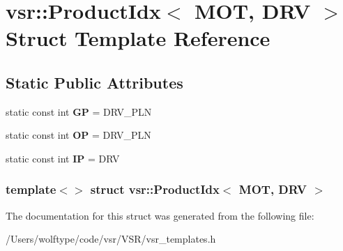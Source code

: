 \hypertarget{structvsr_1_1_product_idx_3_01_m_o_t_00_01_d_r_v_01_4}{\section{vsr\-:\-:Product\-Idx$<$ M\-O\-T, D\-R\-V $>$ Struct Template Reference}
\label{structvsr_1_1_product_idx_3_01_m_o_t_00_01_d_r_v_01_4}
}
\subsection*{Static Public Attributes}
\begin{DoxyCompactItemize}
\item 
\hypertarget{structvsr_1_1_product_idx_3_01_m_o_t_00_01_d_r_v_01_4_a4b8488441d350b8561800867d2665a39}{static const int {\bfseries G\-P} = D\-R\-V\-\_\-\-P\-L\-N}\label{structvsr_1_1_product_idx_3_01_m_o_t_00_01_d_r_v_01_4_a4b8488441d350b8561800867d2665a39}

\item 
\hypertarget{structvsr_1_1_product_idx_3_01_m_o_t_00_01_d_r_v_01_4_a56e9e0be8455bc846af3cfde51de93f4}{static const int {\bfseries O\-P} = D\-R\-V\-\_\-\-P\-L\-N}\label{structvsr_1_1_product_idx_3_01_m_o_t_00_01_d_r_v_01_4_a56e9e0be8455bc846af3cfde51de93f4}

\item 
\hypertarget{structvsr_1_1_product_idx_3_01_m_o_t_00_01_d_r_v_01_4_aa28d3b60347f947f681ea01153667e0e}{static const int {\bfseries I\-P} = D\-R\-V}\label{structvsr_1_1_product_idx_3_01_m_o_t_00_01_d_r_v_01_4_aa28d3b60347f947f681ea01153667e0e}

\end{DoxyCompactItemize}
\subsubsection*{template$<$$>$ struct vsr\-::\-Product\-Idx$<$ M\-O\-T, D\-R\-V $>$}



The documentation for this struct was generated from the following file\-:\begin{DoxyCompactItemize}
\item 
/\-Users/wolftype/code/vsr/\-V\-S\-R/vsr\-\_\-templates.\-h\end{DoxyCompactItemize}
